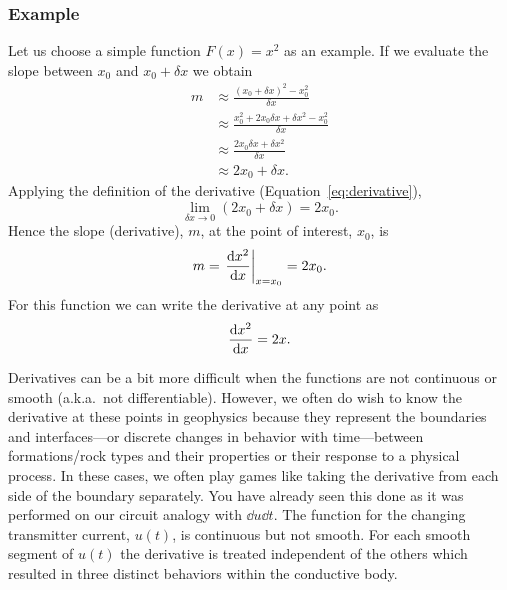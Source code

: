 \subsubsection{Example}
Let us choose a simple function $F(x) = x^2$ as an example.  If we evaluate the
slope between $x_{0}$ and $x_{0} + \delta\! x$ we obtain
\begin{align*}
    m & \approx \frac{(x_0 + \delta\! x)^{2} - x_0^2}{\delta\! x} \\
      & \approx \frac{x_0^{2} + 2 x_0 \delta\! x + \delta\! x^{2} - x_0^2}{\delta\! x} \\
      & \approx \frac{2 x_0 \delta\! x + \delta\! x^2}{\delta\! x} \\
      & \approx 2 x_0 + \delta\! x.
\end{align*}
Applying the definition of the derivative (Equation~\ref{eq:derivative}),
\begin{equation*}
    \lim_{\delta\! x \to 0} (2 x_0 + \delta\! x) = 2 x_0.
\end{equation*}
Hence the slope (derivative), $m$, at the point of interest, $x_{0}$, is
\begin{equation*}
    m = \left. \dv{x^2}{x} \right|_{x = x_0} = 2 x_0.
\end{equation*}
For this function we can write the derivative at any point as
\begin{equation*}
    \dv{x^2}{x} = 2 x.
\end{equation*}

Derivatives can be a bit more difficult when the functions are not continuous or
smooth (a.k.a.\ not differentiable).  However, we often do wish to know the
derivative at these points in geophysics because they represent the boundaries
and interfaces---or discrete changes in behavior with time---between
formations/rock types and their properties or their response to a physical
process.  In these cases, we often play games like taking the derivative from
each side of the boundary separately.  You have already seen this done as it was
performed on our circuit analogy with $\dd{u}\dd{t}$.  The function for the
changing transmitter current, $u(t)$, is continuous but not smooth.  For each
smooth segment of $u(t)$ the derivative is treated independent of the others
which resulted in three distinct behaviors within the conductive body.

